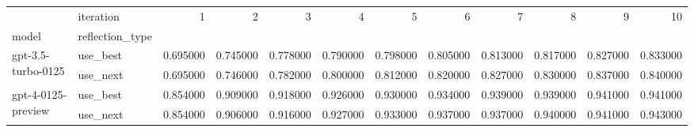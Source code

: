 \begin{tabular}{llrrrrrrrrrr}
\toprule
 & iteration & 1 & 2 & 3 & 4 & 5 & 6 & 7 & 8 & 9 & 10 \\
model & reflection_type &  &  &  &  &  &  &  &  &  &  \\
\midrule
\multirow[t]{2}{*}{gpt-3.5-turbo-0125} & use_best & 0.695000 & 0.745000 & 0.778000 & 0.790000 & 0.798000 & 0.805000 & 0.813000 & 0.817000 & 0.827000 & 0.833000 \\
 & use_next & 0.695000 & 0.746000 & 0.782000 & 0.800000 & 0.812000 & 0.820000 & 0.827000 & 0.830000 & 0.837000 & 0.840000 \\
\cline{1-12}
\multirow[t]{2}{*}{gpt-4-0125-preview} & use_best & 0.854000 & 0.909000 & 0.918000 & 0.926000 & 0.930000 & 0.934000 & 0.939000 & 0.939000 & 0.941000 & 0.941000 \\
 & use_next & 0.854000 & 0.906000 & 0.916000 & 0.927000 & 0.933000 & 0.937000 & 0.937000 & 0.940000 & 0.941000 & 0.943000 \\
\cline{1-12}
\bottomrule
\end{tabular}
